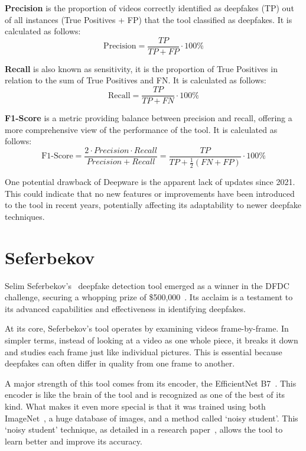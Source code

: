 \textbf{Precision} is the proportion of videos correctly identified as deepfakes
(\ac{TP}) out of all instances (True Positives + \ac{FP}) that the tool classified as deepfakes. It is calculated
as follows:
\begin{equation}
	{\text{Precision}} = \frac{TP}{TP + FP} \cdot \textit{100\%}\label{eq:precision}
\end{equation}

\textbf{Recall} is also known as sensitivity, it is the proportion of True Positives
in relation to the sum of True Positives and \ac{FN}. It is calculated as follows:
\begin{equation}
	{\text{Recall}} = \frac{TP}{TP + FN} \cdot \textit{100\%}\label{eq:recall}
\end{equation}

\textbf{F1-Score} is a metric providing balance between precision and recall, offering
a more comprehensive view of the performance of the tool. It is calculated as follows:
\begin{equation}
	{\text{F1-Score}} = \frac{2 \cdot Precision \cdot Recall}{Precision + Recall}
	= \frac{TP}{TP + \frac{1}{2}(FN + FP)} \cdot \textit{100\%}\label{eq:f1-score}
\end{equation}


One potential drawback of Deepware is the apparent lack of updates since 2021.
This could indicate that no new features or improvements have been introduced
to the tool in recent years, potentially affecting its adaptability to newer
deepfake techniques.


\section{Seferbekov}\label{sec:seferbekov}
Selim Seferbekov's~\cite{seferbekov-github}
deepfake detection tool emerged as a winner in the \ac{DFDC}
challenge, securing a whopping prize of \$500,000~\cite{kaggle2020}. Its acclaim is a testament
to its advanced capabilities and effectiveness in identifying deepfakes.

At its core, Seferbekov's tool operates by examining videos frame-by-frame.
In simpler terms, instead of looking at a video as one whole piece, it
breaks it down and studies each frame just like individual pictures.
This is essential because deepfakes can often differ in quality from one
frame to another.

A major strength of this tool comes from its encoder, the EfficientNet B7~\cite{tan2020efficientnet}.
This encoder is like the brain of the tool and is recognized as one of the
best of its kind. What makes it even more special is that it was trained using
both ImageNet~\cite{ILSVRC15}, a huge database of images, and a method called `noisy student'.
This `noisy student' technique, as detailed in a research paper~\cite{xie2020selftraining},
allows the tool to learn better and improve its accuracy.

